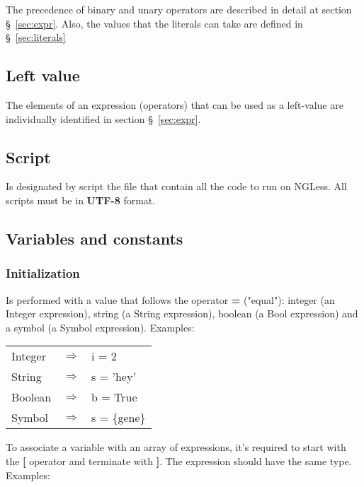 \documentclass{article}
\begin{document}
The precedence of binary and unary operators are described in detail at section §~\ref{sec:expr}. Also, the values that the literals can take are defined in §~\ref{sec:literals}

\subsection{Left value}

The elements of an expression (operators) that can be used as a left-value are individually identified in section §~\ref{sec:expr}. 

\subsection{Script}

Is designated by script the file that contain all the code to run on NGLess. All scripts must be in \textbf{UTF-8} format.


\subsection{Variables and constants}

\subsubsection{Initialization}

Is performed with a value that follows the operator \textbf{=} ("equal"): integer (an Integer expression), string (a String expression), boolean (a Bool expression) and a symbol (a Symbol expression). Examples:

\begin{table}[H]
\center
    \begin{tabular}{lll}
    Integer & $\Longrightarrow$ & i = 2 \\
    String  & $\Longrightarrow$ & s = 'hey' \\
    Boolean & $\Longrightarrow$ & b = True \\
    Symbol  & $\Longrightarrow$ & s = \{gene\} \\
    \end{tabular}
\end{table}

To associate a variable with an array of expressions, it's required to start with the \textbf{[} operator and terminate with \textbf{]}. The expression should have the same type. Examples:\\
\end{document}
